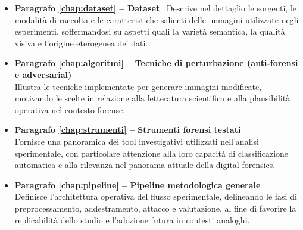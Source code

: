 \begin{itemize}
\item \textbf{Paragrafo \ref{chap:dataset} – Dataset}  \
Descrive nel dettaglio le sorgenti, le modalità di raccolta e le caratteristiche salienti delle immagini utilizzate negli esperimenti, soffermandosi su aspetti quali la varietà semantica, la qualità visiva e l'origine eterogenea dei dati.

\item \textbf{Paragrafo \ref{chap:algoritmi} – Tecniche di perturbazione (anti-forensi e adversarial)} \\
Illustra le tecniche implementate per generare immagini modificate, motivando le scelte in relazione alla letteratura scientifica e alla plausibilità operativa nel contesto forense.

\item \textbf{Paragrafo \ref{chap:strumenti} – Strumenti forensi testati} \\
Fornisce una panoramica dei tool investigativi utilizzati nell'analisi sperimentale, con particolare attenzione alla loro capacità di classificazione automatica e alla rilevanza nel panorama attuale della digital forensics.

\item \textbf{Paragrafo \ref{chap:pipeline} – Pipeline metodologica generale} \\
Definisce l'architettura operativa del flusso sperimentale, delineando le fasi di preprocessamento, addestramento, attacco e valutazione, al fine di favorire la replicabilità dello studio e l'adozione futura in contesti analoghi.
\end{itemize}







